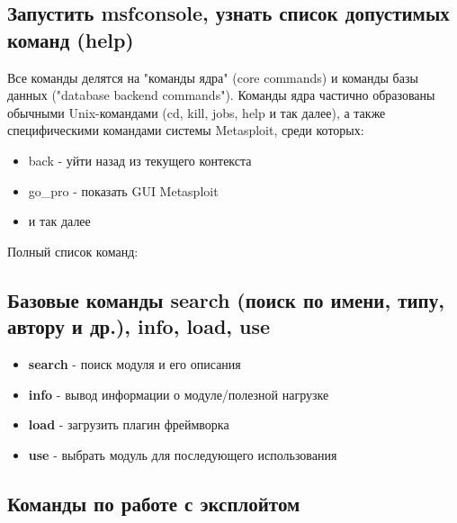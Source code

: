 \documentclass[a4paper]{article}
\begin{document}
\subsection{Запустить msfconsole, узнать список допустимых команд (help)}

Все команды делятся на "команды ядра" (core commands) и команды базы данных ("database backend commands"). Команды ядра частично образованы обычными Unix-командами (cd, kill, jobs, help и так далее), а также специфическими командами системы Metasploit, среди которых:

\begin{itemize}

\item back - уйти назад из текущего контекста

\item go\_pro - показать GUI Metasploit

\item и так далее

\end{itemize}

Полный список команд: 



\subsection{Базовые команды search (поиск по имени, типу, автору и др.), info, load, use}

\begin{itemize}

\item \textbf{search} - поиск модуля и его описания

\item \textbf{info} - вывод информации о модуле/полезной нагрузке

\item \textbf{load} - загрузить плагин фреймворка

\item \textbf{use} - выбрать модуль для последующего использования

\end{itemize}

\subsection{Команды по работе с эксплойтом}
\end{document}

